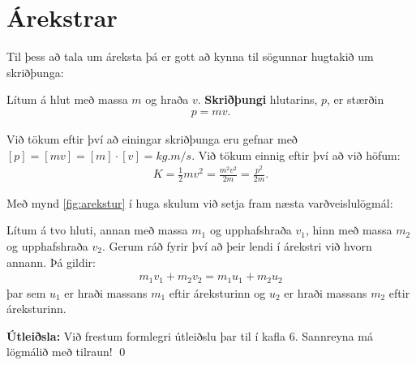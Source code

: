 \newpage

\section{Árekstrar}

Til þess að tala um áreksta þá er gott að kynna til sögunnar hugtakið um skriðþunga:

\begin{tcolorbox}
\begin{definition}
Lítum á hlut með massa $m$ og hraða $v$. \textbf{Skriðþungi} hlutarins, $p$, er stærðin
\begin{align*}
    p = mv.
\end{align*}
\end{definition}
\end{tcolorbox}
Við tökum eftir því að einingar skriðþunga eru gefnar með $[
p] = [mv] = [m] \cdot [v] = \si{kg.m/s}$. Við tökum einnig eftir því að við höfum:
\begin{align*}
    K = \frac{1}{2}mv^2 = \frac{m^2 v^2}{2m} = \frac{p^2}{2m}.
\end{align*}

Með mynd \ref{fig:arekstur} í huga skulum við setja fram næsta varðveislulögmál:

\begin{tcolorbox}
\begin{theorem}
Lítum á tvo hluti, annan með massa $m_1$ og upphafshraða $v_1$, hinn með massa $m_2$ og upphafshraða $v_2$. Gerum ráð fyrir því að þeir lendi í árekstri við hvorn annann. Þá gildir:
\begin{align*}
    m_1 v_1 + m_2 v_2 = m_1 u_1 + m_2 u_2
\end{align*}
þar sem $u_1$ er hraði massans $m_1$ eftir áreksturinn og $u_2$ er hraði massans $m_2$ eftir áreksturinn.
\end{theorem}
\end{tcolorbox}

\textbf{Útleiðsla:} Við frestum formlegri útleiðslu þar til í kafla 6. Sannreyna má lögmálið með tilraun! \qed

